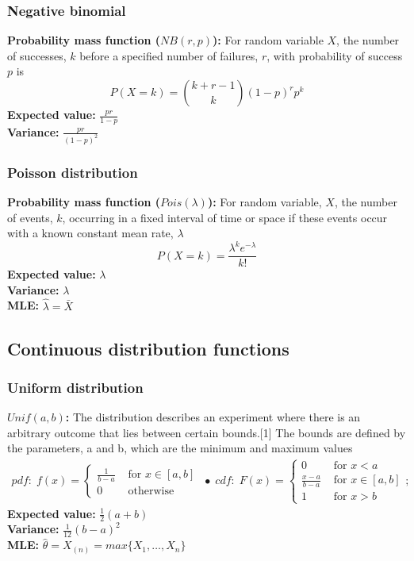 \documentclass{article}
\begin{document}
\subsubsection{Negative binomial}
\textbf{Probability mass function ($NB(r, p)$):} For random variable $X$, the number of successes, $k$ before a specified number of failures, $r$, with probability of success $p$ is
\begin{equation*}
	P(X = k) = {k + r - 1 \choose k} (1-p)^rp^k
\end{equation*}
\textbf{Expected value:} $\frac{pr}{1-p}$\\
\textbf{Variance:} $\frac{pr}{(1 - p)^2}$

\subsubsection{Poisson distribution}
\textbf{Probability mass function ($Pois(\lambda)$):} For random variable, $X$, the number of events, $k$, occurring in a fixed interval of time or space if these events occur with a known constant mean rate, $\lambda$
\begin{equation*}
	P(X = k) = \frac{\lambda^ke^{-\lambda}}{k!}
\end{equation*}
\textbf{Expected value:} $\lambda$\\
\textbf{Variance:} $\lambda$\\
\textbf{MLE:} $\hat{\lambda} = \bar{X}$


\subsection{Continuous distribution functions}
\subsubsection{Uniform distribution}
\textbf{$Unif(a, b)$:} The distribution describes an experiment where there is an arbitrary outcome that lies between certain bounds.[1] The bounds are defined by the parameters, a and b, which are the minimum and maximum values
\begin{align*}
    pdf: \; f(x) = \begin{cases}
        \frac{1}{b-a} & \textrm{ for } x \in [a,b]\\
        0 & \textrm{ otherwise}
    \end{cases} \;\bullet\;
    cdf: \; F(x) = \begin{cases}
        0 & \textrm{ for } x < a\\
        \frac{x-a}{b-a} & \textrm{ for } x \in [a,b]\\
        1 & \textrm{ for } x > b
    \end{cases}; 
\end{align*}
\textbf{Expected value:} $\frac{1}{2}(a + b)$\\
\textbf{Variance:} $\frac{1}{12}(b - a)^2$\\
\textbf{MLE:} $\hat{\theta} = X_{(n)} = max\{X_1, \dots, X_n\}$
\end{document}
